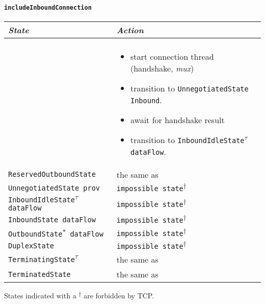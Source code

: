 \documentclass{article}
\def\TCP{\textsf{TCP}}
\def\InitialState{\textbullet}
\def\ReservedOutboundState{\texttt{ReservedOutboundState}}
\def\UnnegotiatedStateIn{\texttt{UnnegotiatedState Inbound}}
\def\UnnegotiatedStateAny{\texttt{UnnegotiatedState prov}}
\def\OutboundStateAny{\texttt{OutboundState\textsuperscript{*} dataFlow}}
\def\DuplexState{\texttt{DuplexState}}
\def\InboundStateAny{\texttt{InboundState dataFlow}}
\def\InboundIdleStateAny{\texttt{InboundIdleState\textsuperscript{$\tau$} dataFlow}}
\def\TerminatingState{\texttt{TerminatingState\textsuperscript{$\tau$}}}
\def\TerminatedState{\texttt{TerminatedState}}
\def\mux{\textit{mux}}
\begin{document}
\paragraph{\texttt{includeInboundConnection}}
\begin{center}
  \begin{tabular}[h]{ll}
    \textit{State}           & \textit{Action} \\\hline\\[2pt]
    \InitialState{}          &
      \begin{minipage}[t]{8cm}
        \begin{itemize}
          \item start connection thread (handshake, \mux{})
          \item transition to \UnnegotiatedStateIn{}.
          \item await for handshake result
          \item transition to \InboundIdleStateAny{}.
        \end{itemize}
      \end{minipage}
      \vspace{8pt}\\
    \ReservedOutboundState{} & the same as \InitialState{} \\[8pt]
    \UnnegotiatedStateAny{}  & \texttt{impossible state}\textsuperscript{$\dagger$} \\[8pt]
    \InboundIdleStateAny{}   & \texttt{impossible state}\textsuperscript{$\dagger$} \\[8pt]
    \InboundStateAny{}       & \texttt{impossible state}\textsuperscript{$\dagger$} \\[8pt]
    \OutboundStateAny{}      & \texttt{impossible state}\textsuperscript{$\dagger$} \\[8pt]
    \DuplexState{}           & \texttt{impossible state}\textsuperscript{$\dagger$} \\[8pt]
    \TerminatingState{}      & the same as \InitialState{} \\[8pt]
    \TerminatedState{}       & the same as \InitialState{} \\[8pt]
  \end{tabular}
\end{center}
States indicated with a \textsuperscript{$\dagger$} are forbidden by \TCP{}.
\end{document}
